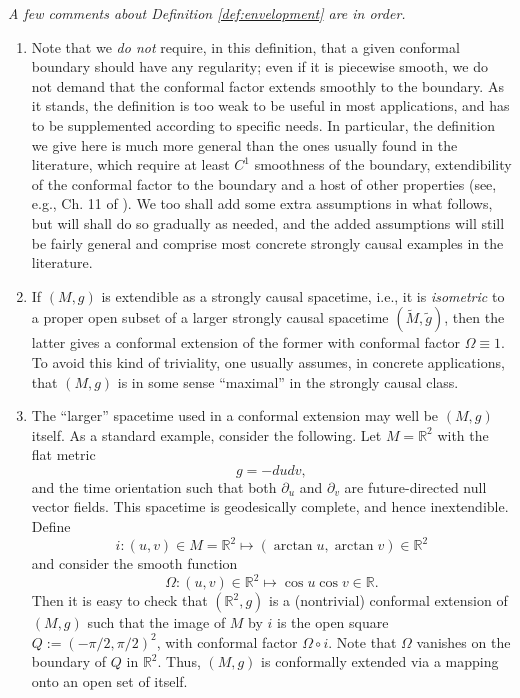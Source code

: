 \begin{remark}\label{rmk1}
{\em A few comments about Definition \ref{def:envelopment} are in order.
\begin{enumerate}
\item Note that we {\em do not} require, in this definition, that a given conformal boundary should have any regularity; even if it is piecewise smooth, we do not demand that the conformal factor extends smoothly to the boundary. As it stands, the definition is too weak to be useful in most applications, and has to be supplemented according to specific needs. In particular, the definition we give here is much more general than the ones usually found in the literature, which require at least $C^1$ smoothness of the boundary, extendibility of the conformal factor to the boundary and a host of other properties (see, e.g., Ch. 11 of \cite{WaldGeneralRelativity1984}). We too shall add some extra assumptions in what follows, but will shall do so gradually as needed, and the added assumptions will still be fairly general and comprise most concrete strongly causal examples in the literature.
\item If $(M,g)$ is extendible as a strongly causal spacetime, i.e., it is {\em isometric} to a proper open subset of a larger strongly causal spacetime $(\tilde{M}, \tilde{g})$, then the latter gives a conformal extension of the former with conformal factor $\Omega \equiv 1$. To avoid this kind of triviality, one usually assumes, in concrete applications, that $(M,g)$ is in some sense ``maximal'' in the strongly causal class.
\item The ``larger'' spacetime used in a conformal extension may well be $(M,g)$ itself. As a standard example, consider the following. Let $M = \mathbb{R}^2$ with the flat metric
\[
g = -dudv,
\]
and the time orientation such that both $\partial_u$ and $\partial_v$ are future-directed null vector fields. This spacetime is geodesically complete, and hence inextendible. Define
\[
i: (u,v) \in M=\mathbb{R}^2 \mapsto (\arctan u,\arctan v) \in \mathbb{R}^2
\]
and consider the smooth function
\[
\label{conformalfactor2}
\Omega : (u,v) \in \mathbb{R}^2 \mapsto \cos u \cos v \in \mathbb{R}.
\]
Then it is easy to check that $(\mathbb{R}^2,g)$ is a (nontrivial) conformal extension of $(M,g)$ such that the image of $M$ by $i$ is the open square $Q:= (-\pi/2, \pi/2)^2$, with conformal factor $\Omega \circ i$. Note that $\Omega$ vanishes on the boundary of $Q$ in $\mathbb{R}^2$. Thus, $(M,g)$ is conformally extended via a mapping onto an open set of itself.

\end{enumerate}}
\end{remark}
